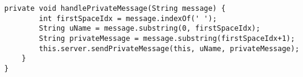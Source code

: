 \begin{enumerate}
\begin{lstlisting}[style=java]
    private void handlePrivateMessage(String message) {
        int firstSpaceIdx = message.indexOf(' ');
        String uName = message.substring(0, firstSpaceIdx);
        String privateMessage = message.substring(firstSpaceIdx+1);
        this.server.sendPrivateMessage(this, uName, privateMessage);
    }
}

\end{lstlisting}

\end{enumerate}


